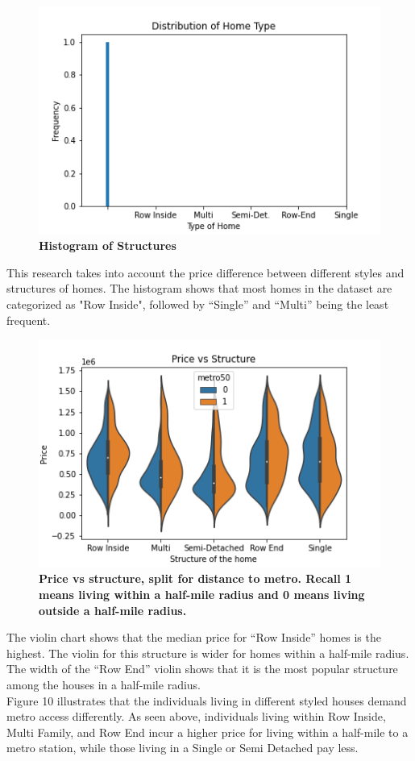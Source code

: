 \documentclass[12pt]{report}
\newcommand\tab[1][.60cm]{\hspace*{#1}}
\begin{document}
\begin{figure}[h]
\begin{center}
\includegraphics[width=130mm]{structureHist.png}
\end{center}
\caption{\textbf{Histogram of Structures}}
\label{fig:strHist}
\end{figure}
This research takes into account the price difference between different styles and structures of homes. The histogram shows that most homes in the dataset are categorized as "Row Inside", followed by “Single” and “Multi” being the least frequent. 
\clearpage
\begin{figure}[h]
\begin{center}
\caption{\textbf{Price vs structure, split for distance to metro. Recall 1 means living within a half-mile radius and 0 means living outside a half-mile radius. }}
\includegraphics[width=130mm]{structureViolin.png}
\end{center}
\label{fig:strVio}
\end{figure}
The violin chart shows that the median price for “Row Inside” homes is the highest. The violin for this structure is wider for homes within a half-mile radius. The width of the “Row End” violin shows that it is the most popular structure among the houses in a half-mile radius.\\
\tab Figure 10 illustrates that the individuals living in different styled houses demand metro access differently. As seen above, individuals living within Row Inside, Multi Family, and Row End incur a higher price for living within a half-mile to a metro station, while those living in a Single or Semi Detached pay less.
\end{document}
